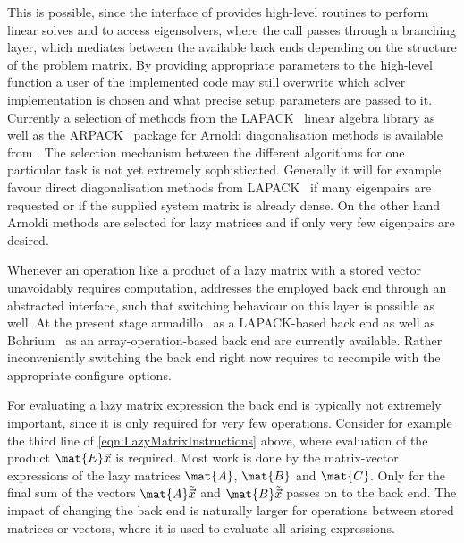 This is possible, since the interface of \lazyten provides
high-level routines to perform linear solves
and to access eigensolvers,
where the call passes through a branching layer,
which mediates between the available back ends depending on the structure
of the problem matrix.
By providing appropriate parameters to the high-level
function a user of the implemented code may still overwrite
which solver implementation
is chosen and what precise setup parameters are passed to it.
Currently a selection of methods from the LAPACK~
linear algebra library as well as the ARPACK~\cite{ARPACK} package
for Arnoldi diagonalisation methods is available from \lazyten.
The selection mechanism between the different algorithms
for one particular task is not yet extremely sophisticated.
Generally it will for example favour
direct diagonalisation methods from LAPACK~
if many eigenpairs are requested
or if the supplied system matrix is already dense.
On the other hand Arnoldi methods are selected for lazy matrices
and if only very few eigenpairs are desired.

Whenever an operation like a product of a lazy matrix
with a stored vector unavoidably requires computation,
\lazyten addresses the employed \LA back end through an abstracted interface,
such that switching behaviour on this layer is possible as well.
At the present stage armadillo~\cite{Armadillo}
as a LAPACK-based back end
as well as Bohrium~\cite{Kristensen2016array,Kristensen2016streaming}
as an array-operation-based back end are currently available.
Rather inconveniently switching the back end
right now requires to recompile \lazyten
with the appropriate configure options.

For evaluating a lazy matrix \contraction expression the \LA back end
is typically not extremely important,
since it is only required for very few operations.
Consider for example the third line of \eqref{eqn:LazyMatrixInstructions} above,
where evaluation of the product $\mat{E}\vec{x}$ is required.
Most work is done by the matrix-vector \contraction expressions
of the lazy matrices $\mat{A}$, $\mat{B}$ and $\mat{C}$.
Only for the final sum of the vectors
$\mat{A} \tilde{\vec{x}}$ and $\mat{B} \tilde{\vec{x}}$
\lazyten passes on to the \LA back end.
The impact of changing the back end is naturally larger for operations
between stored matrices or vectors,
where it is used to evaluate all arising expressions.

